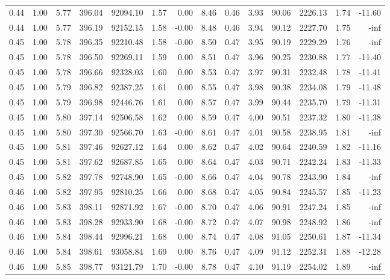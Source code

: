 \begin{table}[!ht]
\begin{tabular}{rrrrrrrrrrrrrr}
0.44 & 1.00 & 5.77 & 396.04 & 92094.10 & 1.57 & 0.00 & 8.46 & 0.46 & 3.93 & 90.06 & 2226.13 & 1.74 & -11.60 \\
0.44 & 1.00 & 5.77 & 396.19 & 92152.15 & 1.58 & -0.00 & 8.48 & 0.46 & 3.94 & 90.12 & 2227.70 & 1.75 & -inf \\
0.45 & 1.00 & 5.78 & 396.35 & 92210.48 & 1.58 & -0.00 & 8.50 & 0.47 & 3.95 & 90.19 & 2229.29 & 1.76 & -inf \\
0.45 & 1.00 & 5.78 & 396.50 & 92269.11 & 1.59 & 0.00 & 8.51 & 0.47 & 3.96 & 90.25 & 2230.88 & 1.77 & -11.40 \\
0.45 & 1.00 & 5.78 & 396.66 & 92328.03 & 1.60 & 0.00 & 8.53 & 0.47 & 3.97 & 90.31 & 2232.48 & 1.78 & -11.41 \\
0.45 & 1.00 & 5.79 & 396.82 & 92387.25 & 1.61 & 0.00 & 8.55 & 0.47 & 3.98 & 90.38 & 2234.08 & 1.79 & -11.48 \\
0.45 & 1.00 & 5.79 & 396.98 & 92446.76 & 1.61 & 0.00 & 8.57 & 0.47 & 3.99 & 90.44 & 2235.70 & 1.79 & -11.31 \\
0.45 & 1.00 & 5.80 & 397.14 & 92506.58 & 1.62 & 0.00 & 8.59 & 0.47 & 4.00 & 90.51 & 2237.32 & 1.80 & -11.38 \\
0.45 & 1.00 & 5.80 & 397.30 & 92566.70 & 1.63 & -0.00 & 8.61 & 0.47 & 4.01 & 90.58 & 2238.95 & 1.81 & -inf \\
0.45 & 1.00 & 5.81 & 397.46 & 92627.12 & 1.64 & 0.00 & 8.62 & 0.47 & 4.02 & 90.64 & 2240.59 & 1.82 & -11.16 \\
0.45 & 1.00 & 5.81 & 397.62 & 92687.85 & 1.65 & 0.00 & 8.64 & 0.47 & 4.03 & 90.71 & 2242.24 & 1.83 & -11.33 \\
0.45 & 1.00 & 5.82 & 397.78 & 92748.90 & 1.65 & -0.00 & 8.66 & 0.47 & 4.04 & 90.78 & 2243.90 & 1.84 & -inf \\
0.46 & 1.00 & 5.82 & 397.95 & 92810.25 & 1.66 & 0.00 & 8.68 & 0.47 & 4.05 & 90.84 & 2245.57 & 1.85 & -11.23 \\
0.46 & 1.00 & 5.83 & 398.11 & 92871.92 & 1.67 & -0.00 & 8.70 & 0.47 & 4.06 & 90.91 & 2247.24 & 1.85 & -inf \\
0.46 & 1.00 & 5.83 & 398.28 & 92933.90 & 1.68 & -0.00 & 8.72 & 0.47 & 4.07 & 90.98 & 2248.92 & 1.86 & -inf \\
0.46 & 1.00 & 5.84 & 398.44 & 92996.21 & 1.68 & 0.00 & 8.74 & 0.47 & 4.08 & 91.05 & 2250.61 & 1.87 & -11.34 \\
0.46 & 1.00 & 5.84 & 398.61 & 93058.84 & 1.69 & 0.00 & 8.76 & 0.47 & 4.09 & 91.12 & 2252.31 & 1.88 & -12.28 \\
0.46 & 1.00 & 5.85 & 398.77 & 93121.79 & 1.70 & -0.00 & 8.78 & 0.47 & 4.10 & 91.19 & 2254.02 & 1.89 & -inf \\

\end{tabular}
\end{table}

